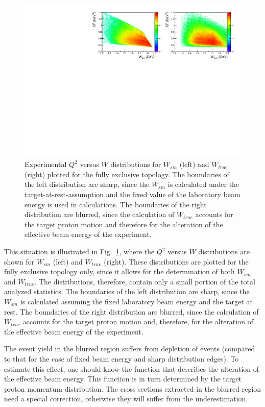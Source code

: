 \begin{figure}[htp]
\begin{center}
\includegraphics[width=16.5cm]{pictures/cross_section/blurring.pdf}
\caption{\small Experimental $Q^2$ versus $W$ distributions for $W_{sm}$ (left) and $W_{true}$ (right) plotted for the fully exclusive topology. The boundaries of the left distribution are sharp, since the $W_{sm}$ is calculated under the target-at-rest-assumption and the fixed value of the laboratory beam energy is used in calculations. The boundaries of the right distribution are blurred, since the calculation of $W_{true}$ accounts for the target proton motion and therefore for the alteration of the effective beam energy of the experiment.} \label{fig:blurring}
\end{center}
\end{figure}

This situation is illustrated in Fig.~\ref{fig:blurring}, where the $Q^2$ versus $W$ distributions are shown for $W_{sm}$ (left) and $W_{true}$ (right). These distributions are plotted for the fully exclusive topology only, since it allows for the determination of both $W_{sm}$ and $W_{true}$. The distributions, therefore, contain only a small portion of the total analyzed statistics. The boundaries of the left distribution are sharp, since the $W_{sm}$ is calculated assuming the fixed laboratory beam energy and the target at rest. The boundaries of the right distribution are blurred, since the calculation of $W_{true}$ accounts for the target proton motion and, therefore, for the alteration of the effective beam energy of the experiment.


The event yield in the blurred region suffers from depletion of events (compared to that for the case of fixed beam energy and sharp distribution edges). To estimate this effect, one should know the function that describes the alteration of the effective beam energy. This function is in turn determined by the target proton momentum distribution. The cross sections extracted in the blurred region need a special correction, otherwise they will suffer from the underestimation.


